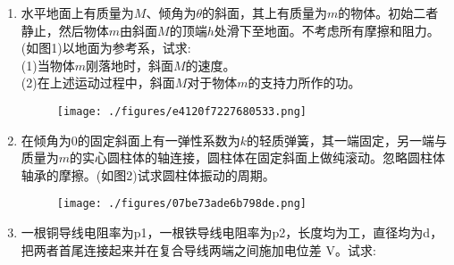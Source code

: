 
\begin{enumerate}
\item 水平地面上有质量为$M$、倾角为$\theta$的斜面，其上有质量为$m$的物体。初始二者静止，然后物体$m$由斜面$M$的顶端$h$处滑下至地面。不考虑所有摩擦和阻力。(如图1)以地面为参考系，试求:\\
(1)当物体$m$刚落地时，斜面$M$的速度。\\
(2)在上述运动过程中，斜面$M$对于物体$m$的支持力所作的功。
\begin{figure}[ht]
\centering
\texttt{[image: ./figures/e4120f7227680533.png]}
\caption{} \label{fig_SSDPEE_1}
\end{figure}
\item 在倾角为0的固定斜面上有一弹性系数为$k$的轻质弹簧，其一端固定，另一端与质量为$m$的实心圆柱体的轴连接，圆柱体在固定斜面上做纯滚动。忽略圆柱体轴承的摩擦。(如图2)试求圆柱体振动的周期。
\begin{figure}[ht]
\centering
\texttt{[image: ./figures/07be73ade6b798de.png]}
\caption{} \label{fig_SSDPEE_2}
\end{figure}
\item 一根铜导线电阻率为p1，一根铁导线电阻率为p2，长度均为工，直径均为d，把两者首尾连接起来并在复合导线两端之间施加电位差 V。试求:
\end{enumerate}